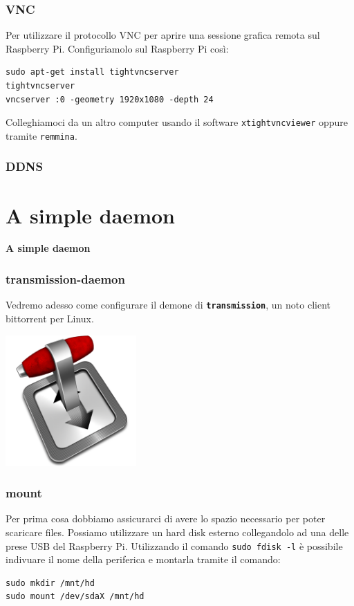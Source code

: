 \documentclass[xcolor=svgnames,11pt]{beamer}
\begin{document}
\begin{frame}[fragile]\frametitle{VNC}
Per utilizzare il protocollo VNC per aprire una sessione grafica remota sul Raspberry Pi. Configuriamolo sul Raspberry Pi cos\`i:
\medskip
\begin{verbatim}
sudo apt-get install tightvncserver
tightvncserver
vncserver :0 -geometry 1920x1080 -depth 24
\end{verbatim}
Colleghiamoci da un altro computer usando il software \texttt{xtightvncviewer} oppure tramite \texttt{remmina}.
\end{frame}

\begin{frame}\frametitle{DDNS}
    


\end{frame}

\section{A simple daemon}
\begin{frame}{}
\begin{center}
\begin{Huge}
{\color{green_raspi} \textbf{A simple daemon}}
\end{Huge}
\end{center}
\end{frame}

\begin{frame}\frametitle{transmission-daemon}
Vedremo adesso come configurare il demone di \texttt{\textbf{transmission}}, un noto client bittorrent per Linux.
\medskip
\begin{center}
\includegraphics[width=5cm]{transmission-icon.png}
\end{center}
\end{frame}

\begin{frame}[fragile]\frametitle{mount}
Per prima cosa dobbiamo assicurarci di avere lo spazio necessario per poter scaricare files. Possiamo utilizzare un hard disk esterno collegandolo ad una delle prese USB del Raspberry Pi.
\medskip
Utilizzando il comando \texttt{sudo fdisk -l} \`e possibile indivuare il nome della periferica e montarla tramite il comando:
\begin{verbatim}
sudo mkdir /mnt/hd
sudo mount /dev/sdaX /mnt/hd
\end{verbatim}
\end{frame}
\end{document}
